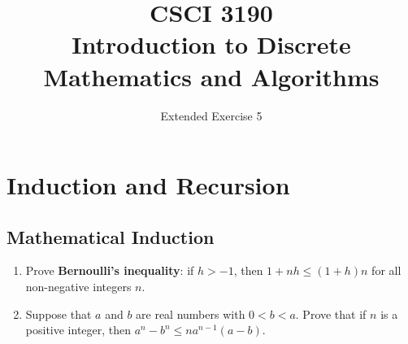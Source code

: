 \documentclass{sig-alternate-05-2015}
\begin{document}






%

\title{CSCI 3190 \\ Introduction to Discrete Mathematics and Algorithms}
\subtitle{Extended Exercise 5}

\maketitle
\begin{abstract}

\end{abstract}

\keywords{}

\section{Induction and Recursion}
\subsection{Mathematical Induction}
\begin{enumerate}
\item Prove \textbf{Bernoulli’s inequality}: if $h > -1$, then $1+nh \le (1+h)n$ for all non-negative integers $n$.

\item Suppose that $a$ and $b$ are real numbers with $0 < b < a$.
Prove that if $n$ is a positive integer, then $a^n - b^n \le na^{n - 1}(a - b)$.
\end{enumerate}
\end{document}
